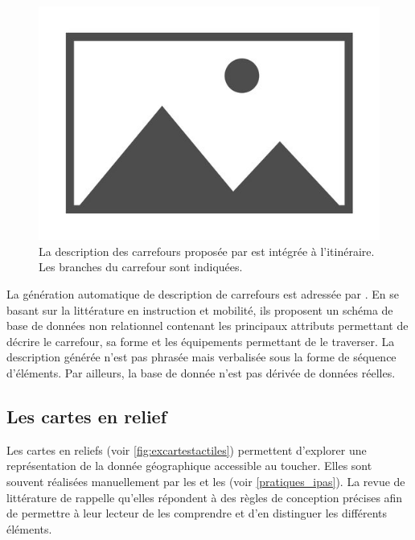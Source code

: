 \begin{figure}
    \centering
    \includegraphics{images/placeholder.jpg}
    \caption{La description des carrefours proposée par \cite{gaunet_verbal_2006} est intégrée à l'itinéraire. Les branches du carrefour sont indiquées.}
    \label{fig:exdesccarrefour}
\end{figure}

La génération automatique de description de carrefours est adressée par \cite{Guth2019}. En se basant sur la littérature en instruction et mobilité, ils proposent un schéma de base de données non relationnel contenant les principaux attributs permettant de décrire le carrefour, sa forme et les équipements permettant de le traverser. La description générée n'est pas phrasée mais verbalisée sous la forme de séquence d'éléments. Par ailleurs, la base de donnée n'est pas dérivée de données réelles.

\subsection{Les cartes en relief}

Les cartes en reliefs (voir \ref{fig:excartestactiles}) permettent d'explorer une représentation de la donnée géographique accessible au toucher. Elles sont souvent réalisées manuellement par les \ipas{} et les \adts{} (voir \ref{pratiques_ipas}). La revue de littérature de \cite{Wabinski2022} rappelle qu'elles répondent à des règles de conception précises afin de permettre à leur lecteur de les comprendre et d'en distinguer les différents éléments.


